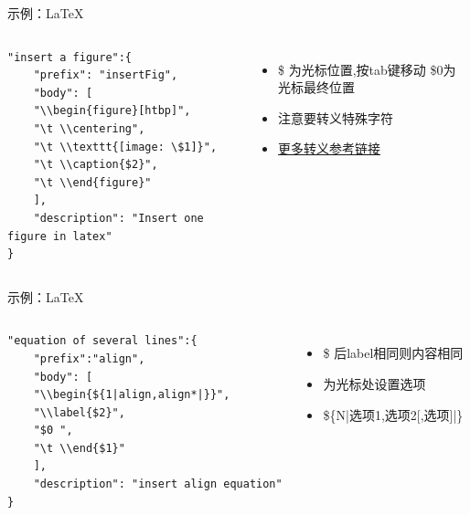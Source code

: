 \documentclass{beamer}
\begin{document}
\begin{frame}[fragile]{示例：\LaTeX}
    \begin{columns}

        \begin{lstlisting}[language=Tex,basicstyle=\tiny]
    "insert a figure":{
    "prefix": "insertFig",
    "body": [
    "\\begin{figure}[htbp]",
    "\t \\centering",
    "\t \\texttt{[image: \$1]}",
    "\t \\caption{$2}",
    "\t \\end{figure}"
    ],
    "description": "Insert one figure in latex"
}
    \end{lstlisting}

        \begin{itemize}
            \item \$ 为光标位置,按tab键移动 \$0为光标最终位置
            \item 注意要转义特殊字符
            \item  \href{https://www.tutorialspoint.com/json_simple/json_simple_escape_characters.htm}{更多转义参考链接}
        \end{itemize}

    \end{columns}
\end{frame}

\begin{frame}[fragile]{示例：\LaTeX}
    \begin{columns}
        \begin{lstlisting}[language=Tex,basicstyle=\tiny]
"equation of several lines":{
    "prefix":"align",
    "body": [
    "\\begin{${1|align,align*|}}",
    "\\label{$2}",
    "$0 ",
    "\t \\end{$1}"
    ],
    "description": "insert align equation"
}
    \end{lstlisting}

        \begin{itemize}
            \item \$ 后label相同则内容相同
            \item 为光标处设置选项
            \item \$\{N|选项1,选项2[,选项]|\}
        \end{itemize}

    \end{columns}
\end{frame}
\end{document}
